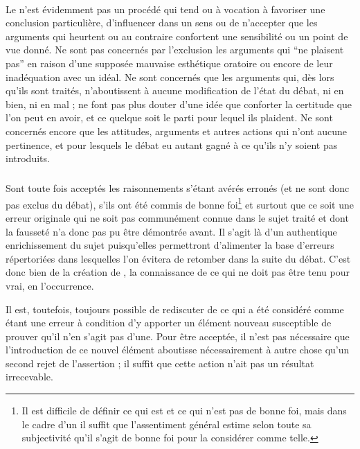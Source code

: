 \paragraph*{}
Le \mainabbr{} n’est évidemment pas un procédé qui tend ou à vocation à favoriser une conclusion particulière, d’influencer dans un sens ou de n’accepter que les arguments qui heurtent ou au contraire confortent une sensibilité ou un point de vue donné. Ne sont pas concernés par l’exclusion les arguments qui \enquote{ne plaisent pas} en raison d’une supposée mauvaise esthétique oratoire ou encore de leur inadéquation avec un idéal. Ne sont concernés que les arguments qui, dès lors qu’ils sont traités, n’aboutissent à aucune modification de l’état du débat, ni en bien, ni en mal ; ne font pas plus douter d’une idée que conforter la certitude que l’on peut en avoir, et ce quelque soit le parti pour lequel ils plaident. Ne sont concernés encore que les attitudes, arguments et autres actions qui n’ont aucune pertinence, et pour lesquels le débat eu {autant} gagné à ce qu’ils n’y soient pas introduits.

\subparagraph*{}
Sont toute fois acceptés les raisonnements s’étant avérés erronés (et ne sont donc pas exclus du débat), s’ils ont été commis de bonne foi\footnote{Il est difficile de définir ce qui est et ce qui n’est pas de bonne foi, mais dans le cadre d’un \mainabbr{} il suffit que l’assentiment général estime selon toute sa subjectivité qu’il s’agit de bonne foi pour la considérer comme telle.}
et surtout que ce soit une erreur originale qui ne soit pas communément connue dans le sujet traité et dont la fausseté n’a donc pas pu être démontrée avant. Il s’agit là d’un authentique enrichissement du sujet puisqu’elles permettront d’alimenter la base d’erreurs répertoriées dans lesquelles l’on évitera de retomber dans la suite du débat. C’est donc bien de la création de , la connaissance de ce qui ne doit pas être tenu pour vrai, en l’occurrence.

Il est, toutefois, toujours possible de rediscuter de ce qui a été considéré comme étant une erreur à condition d’y apporter un élément nouveau susceptible de prouver qu’il n’en s’agit pas d’une. Pour être acceptée, il n’est pas nécessaire que l’introduction de ce nouvel élément aboutisse nécessairement à autre chose qu’un second rejet de l’assertion ; il suffit que cette action n’ait pas un résultat  irrecevable.

